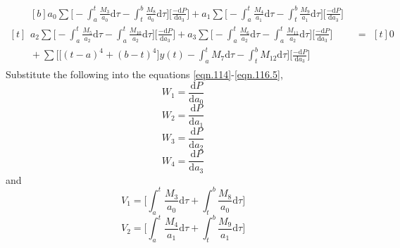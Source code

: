 \documentclass{article}
\begin{document}
\begin{equation}\label{eqn.116.5}
\begin{aligned}[t]
	\begin{aligned}[b]
	a_{0} \sum \bigg[-\int_{a}^{t}\frac{M_{3}}{a_{0}}\mathrm{d}\tau-\int_{t}^{b}\frac{M_{8}}{a_{0}}\mathrm{d}\tau\bigg] \bigg[\frac{-\mathrm{d}P}{\mathrm{d}a_{3}}\bigg] + a_{1} \sum \bigg[-\int_{a}^{t}\frac{M_{4}}{a_{1}}\mathrm{d}\tau-\int_{t}^{b}\frac{M_{9}}{a_{1}}\mathrm{d}\tau\bigg] \bigg[\frac{-\mathrm{d}P}{\mathrm{d}a_{3}}\bigg] \\
	a_{2} \sum \bigg[-\int_{a}^{t}\frac{M_{5}}{a_{2}}\mathrm{d}\tau-\int_{a}^{t}\frac{M_{10}}{a_{2}}\mathrm{d}\tau\bigg] \bigg[\frac{-\mathrm{d}P}{\mathrm{d}a_{3}}\bigg] + a_{3} \sum \bigg[-\int_{a}^{t}\frac{M_{6}}{a_{2}}\mathrm{d}\tau-\int_{a}^{t}\frac{M_{11}}{a_{2}}\mathrm{d}\tau\bigg] \bigg[\frac{-\mathrm{d}P}{\mathrm{d}a_{3}}\bigg] \\ 
	{} +\sum\bigg[\big[(t-a)^4+(b-t)^4\big]y(t) -\int_{a}^{t}{M_{7}}\mathrm{d}\tau-\int_{t}^{b}{M_{12}}\mathrm{d}\tau \bigg]\bigg[\frac{-\mathrm{d}P}{\mathrm{d}a_{3}}\bigg]
	\end{aligned}
	& =
	\begin{aligned}[t]
	0
	\end{aligned}
\end{aligned}
\end{equation}
Substitute the following into the equations \eqref{eqn.114}-\eqref{eqn.116.5},
\begin{equation}\label{eqn.117}
W_{1} = \frac{\mathrm{d}P}{\mathrm{d}a_{0}}
\end{equation}
\begin{equation}\label{eqn.118}
W_{2} = \frac{\mathrm{d}P}{\mathrm{d}a_{1}}
\end{equation}
\begin{equation}\label{eqn.119}
W_{3} = \frac{\mathrm{d}P}{\mathrm{d}a_{2}}
\end{equation}
\begin{equation}\label{eqn.119.5}
W_{4} = \frac{\mathrm{d}P}{\mathrm{d}a_{3}}
\end{equation}
and
\begin{equation}\label{eqn.120}
V_{1} = \bigg[\int_{a}^{t}\frac{M_{3}}{a_{0}} \mathrm{d}\tau + \int_{t}^{b}\frac{M_{8}}{a_{0}} \mathrm{d}\tau \bigg]
\end{equation}
\begin{equation}\label{eqn.121}
V_{2} = \bigg[\int_{a}^{t}\frac{M_{4}}{a_{1}} \mathrm{d}\tau + \int_{t}^{b}\frac{M_{9}}{a_{1}} \mathrm{d}\tau \bigg]
\end{equation}
\end{document}
